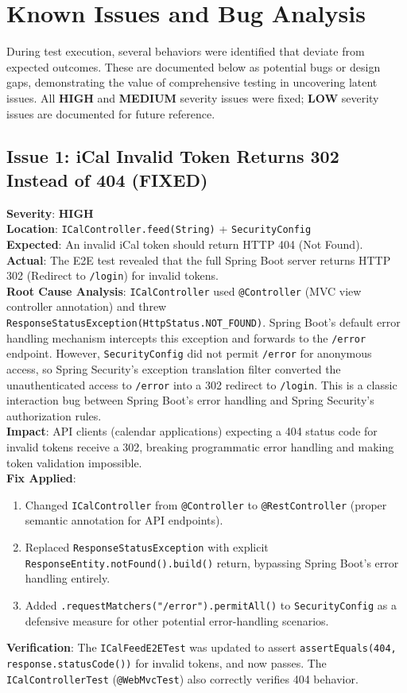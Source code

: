 \documentclass[11pt]{article}
\begin{document}
  \section{Known Issues and Bug Analysis}
  \label{sec:bugs}
  During test execution, several behaviors were identified that deviate from expected outcomes. These are documented below as potential bugs or design gaps, demonstrating the value of comprehensive testing in uncovering latent issues. All \textbf{HIGH} and \textbf{MEDIUM} severity issues were fixed; \textbf{LOW} severity issues are documented for future reference.

  \subsection{Issue 1: iCal Invalid Token Returns 302 Instead of 404 (FIXED)}
  \label{sec:bug-ical}
  \textbf{Severity}: \textbf{HIGH} \\
  \textbf{Location}: \texttt{ICalController.feed(String)} + \texttt{SecurityConfig} \\
  \textbf{Expected}: An invalid iCal token should return HTTP 404 (Not Found). \\
  \textbf{Actual}: The E2E test revealed that the full Spring Boot server returns HTTP 302 (Redirect to \texttt{/login}) for invalid tokens. \\
  \textbf{Root Cause Analysis}: \texttt{ICalController} used \texttt{@Controller} (MVC view controller annotation) and threw \texttt{ResponseStatusException(HttpStatus.NOT\_FOUND)}. Spring Boot's default error handling mechanism intercepts this exception and forwards to the \texttt{/error} endpoint. However, \texttt{SecurityConfig} did not permit \texttt{/error} for anonymous access, so Spring Security's exception translation filter converted the unauthenticated access to \texttt{/error} into a 302 redirect to \texttt{/login}. This is a classic interaction bug between Spring Boot's error handling and Spring Security's authorization rules. \\
  \textbf{Impact}: API clients (calendar applications) expecting a 404 status code for invalid tokens receive a 302, breaking programmatic error handling and making token validation impossible. \\
  \textbf{Fix Applied}: 
  \begin{enumerate}
    \item Changed \texttt{ICalController} from \texttt{@Controller} to \texttt{@RestController} (proper semantic annotation for API endpoints).
    \item Replaced \texttt{ResponseStatusException} with explicit \texttt{ResponseEntity.notFound().build()} return, bypassing Spring Boot's error handling entirely.
    \item Added \texttt{.requestMatchers("/error").permitAll()} to \texttt{SecurityConfig} as a defensive measure for other potential error-handling scenarios.
  \end{enumerate}
  \textbf{Verification}: The \texttt{ICalFeedE2ETest} was updated to assert \texttt{assertEquals(404, response.statusCode())} for invalid tokens, and now passes. The \texttt{ICalControllerTest} (\texttt{@WebMvcTest}) also correctly verifies 404 behavior.
\end{document}
